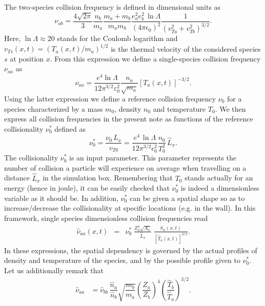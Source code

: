 \documentclass[11pt]{article}
\begin{document}
The two-species collision frequency is defined in dimensional units as
%
\begin{equation}  \label{eq:def_nuab}
\nu_{ab} = \frac{4\sqrt{2\pi}}{3} \frac{n_b}{m_a}\frac{m_a+m_b}{m_am_b} 
\frac{e_a^2e_b^2\, \ln\Lambda}{(4\pi\epsilon_0)^2} 
\frac{1}{(v_{Ta}^2+v_{Tb}^2)^{3/2}}.
\end{equation} 
%
Here, $\ln\Lambda \approx20$ stands for the Coulomb logarithm and $v_{Ts}(x,t) = (T_a(x,t)/m_a)^{1/2}$ is the thermal velocity of the considered species $s$ at position $x$. From this expression we define a single-species collision frequency $\nu_{aa}$ as
%
\begin{equation}\label{eq:nu_aa}
  \nu_{aa} = \dfrac{e^{4}\ln \Lambda}{12 \pi^{3/2} \varepsilon_0^{2}} \dfrac{n_a}{\sqrt{m_a}  }\left[ T_a(x,t) \right]^{-3/2}.
\end{equation}
%
Using the latter expression we define a reference collision frequency $\nu_0$ for a species characterized by a mass $m_0$, density $n_0$ and temperature $T_0$. We then express all collision frequencies in the present note as functions of the reference collisionality $\nu^*_0$ defined as 
%
\begin{equation}
	\nu^*_0 
	= \frac{\nu_{0}\, L_x}{v_{T0}} 
	= \frac{e^4\, \ln\Lambda}{12\pi^{3/2}\epsilon_0^2} 
	\frac{n_0}{T_0^2}\, \hat L_x.
\end{equation}
%
The collisionality $\nu_0^*$ is an input parameter. This parameter represents the number of collision a particle will experience on average when travelling on a distance $\hat{L}_x$ in the simulation box. Remembering that $T_0$ stands actually for an energy (hence in joule), it can be easily checked that $\nu^*_0$ is indeed a dimensionless variable as it should be. In addition, $\nu^*_0$ can be given a spatial shape so as to increase/decrease the collisionality at specific locations (e.g. in the wall). In this framework, single species dimensionless collision frequencies read
%
\begin{eqnarray}
	\hat\nu_{aa}(x,t) 
	&=& \nu^*_0\; \frac{Z_a^4 \sqrt{A_a}}{\hat L_x}\; \frac{\hat n_a(x,t)}{[\hat T_a(x,t)]^{3/2}}.
\end{eqnarray}
%
In these expressions, the spatial dependency is governed by the actual profiles of density and temperature of the species, and by the possible profile given to $\nu^*_0$. Let us additionally remark that 
%
\begin{align}
  \hat{\nu}_{aa} & = \hat{\nu}_{b b} \, \dfrac{\hat{n}_a}{\hat{n}_b} \sqrt{\dfrac{m_b}{m_a}} \left( \dfrac{Z_a}{Z_b} \right) ^{4} \left( \dfrac{\hat{T}_b}{\hat{T}_a} \right) ^{3/2}.
\end{align}
%
\end{document}
